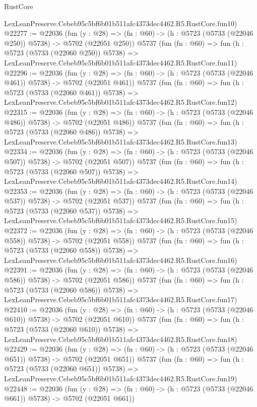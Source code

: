\begin{lexlean}{RustCore}
\begin{coremodule}
    LexLeanPreserve.Cebeb95c5bf6b01b511afc4373dec4462.R5.RustCore.fun10)
@22277 := @22036
    (fun (y : @28) => (fn : @60) -> (h : @5723 (@5733 (@22046 @250)) @5738) -> @5702 (@22051 @250))
    @5737
    (fun (fn : @60) =>
    fun (h : @5723 (@5733 (@22060 @250)) @5738) =>
    LexLeanPreserve.Cebeb95c5bf6b01b511afc4373dec4462.R5.RustCore.fun11)
@22296 := @22036
    (fun (y : @28) => (fn : @60) -> (h : @5723 (@5733 (@22046 @461)) @5738) -> @5702 (@22051 @461))
    @5737
    (fun (fn : @60) =>
    fun (h : @5723 (@5733 (@22060 @461)) @5738) =>
    LexLeanPreserve.Cebeb95c5bf6b01b511afc4373dec4462.R5.RustCore.fun12)
@22315 := @22036
    (fun (y : @28) => (fn : @60) -> (h : @5723 (@5733 (@22046 @486)) @5738) -> @5702 (@22051 @486))
    @5737
    (fun (fn : @60) =>
    fun (h : @5723 (@5733 (@22060 @486)) @5738) =>
    LexLeanPreserve.Cebeb95c5bf6b01b511afc4373dec4462.R5.RustCore.fun13)
@22334 := @22036
    (fun (y : @28) => (fn : @60) -> (h : @5723 (@5733 (@22046 @507)) @5738) -> @5702 (@22051 @507))
    @5737
    (fun (fn : @60) =>
    fun (h : @5723 (@5733 (@22060 @507)) @5738) =>
    LexLeanPreserve.Cebeb95c5bf6b01b511afc4373dec4462.R5.RustCore.fun14)
@22353 := @22036
    (fun (y : @28) => (fn : @60) -> (h : @5723 (@5733 (@22046 @537)) @5738) -> @5702 (@22051 @537))
    @5737
    (fun (fn : @60) =>
    fun (h : @5723 (@5733 (@22060 @537)) @5738) =>
    LexLeanPreserve.Cebeb95c5bf6b01b511afc4373dec4462.R5.RustCore.fun15)
@22372 := @22036
    (fun (y : @28) => (fn : @60) -> (h : @5723 (@5733 (@22046 @558)) @5738) -> @5702 (@22051 @558))
    @5737
    (fun (fn : @60) =>
    fun (h : @5723 (@5733 (@22060 @558)) @5738) =>
    LexLeanPreserve.Cebeb95c5bf6b01b511afc4373dec4462.R5.RustCore.fun16)
@22391 := @22036
    (fun (y : @28) => (fn : @60) -> (h : @5723 (@5733 (@22046 @586)) @5738) -> @5702 (@22051 @586))
    @5737
    (fun (fn : @60) =>
    fun (h : @5723 (@5733 (@22060 @586)) @5738) =>
    LexLeanPreserve.Cebeb95c5bf6b01b511afc4373dec4462.R5.RustCore.fun17)
@22410 := @22036
    (fun (y : @28) => (fn : @60) -> (h : @5723 (@5733 (@22046 @610)) @5738) -> @5702 (@22051 @610))
    @5737
    (fun (fn : @60) =>
    fun (h : @5723 (@5733 (@22060 @610)) @5738) =>
    LexLeanPreserve.Cebeb95c5bf6b01b511afc4373dec4462.R5.RustCore.fun18)
@22429 := @22036
    (fun (y : @28) => (fn : @60) -> (h : @5723 (@5733 (@22046 @651)) @5738) -> @5702 (@22051 @651))
    @5737
    (fun (fn : @60) =>
    fun (h : @5723 (@5733 (@22060 @651)) @5738) =>
    LexLeanPreserve.Cebeb95c5bf6b01b511afc4373dec4462.R5.RustCore.fun19)
@22448 := @22036
    (fun (y : @28) => (fn : @60) -> (h : @5723 (@5733 (@22046 @661)) @5738) -> @5702 (@22051 @661))

\end{coremodule}
\end{lexlean}

